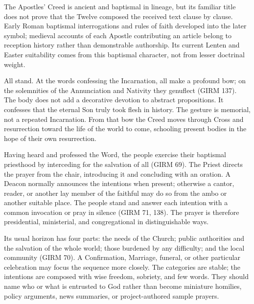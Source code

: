 The Apostles' Creed is ancient and baptismal in lineage, but its familiar title does not prove that the Twelve composed the received text clause by clause. Early Roman baptismal interrogations and rules of faith developed into the later symbol; medieval accounts of each Apostle contributing an article belong to reception history rather than demonstrable authorship. Its current Lenten and Easter suitability comes from this baptismal character, not from lesser doctrinal weight.

All stand. At the words confessing the Incarnation, all make a profound bow; on the solemnities of the Annunciation and Nativity they genuflect (GIRM 137). The body does not add a decorative devotion to abstract propositions. It confesses that the eternal Son truly took flesh in history. The gesture is memorial, not a repeated Incarnation. From that bow the Creed moves through Cross and resurrection toward the life of the world to come, schooling present bodies in the hope of their own resurrection.


Having heard and professed the Word, the people exercise their baptismal priesthood by interceding for the salvation of all (GIRM 69). The Priest directs the prayer from the chair, introducing it and concluding with an oration. A Deacon normally announces the intentions when present; otherwise a cantor, reader, or another lay member of the faithful may do so from the ambo or another suitable place. The people stand and answer each intention with a common invocation or pray in silence (GIRM 71, 138). The prayer is therefore presidential, ministerial, and congregational in distinguishable ways.

Its usual horizon has four parts: the needs of the Church; public authorities and the salvation of the whole world; those burdened by any difficulty; and the local community (GIRM 70). A Confirmation, Marriage, funeral, or other particular celebration may focus the sequence more closely. The categories are stable; the intentions are composed with wise freedom, sobriety, and few words. They should name who or what is entrusted to God rather than become miniature homilies, policy arguments, news summaries, or project-authored sample prayers.

